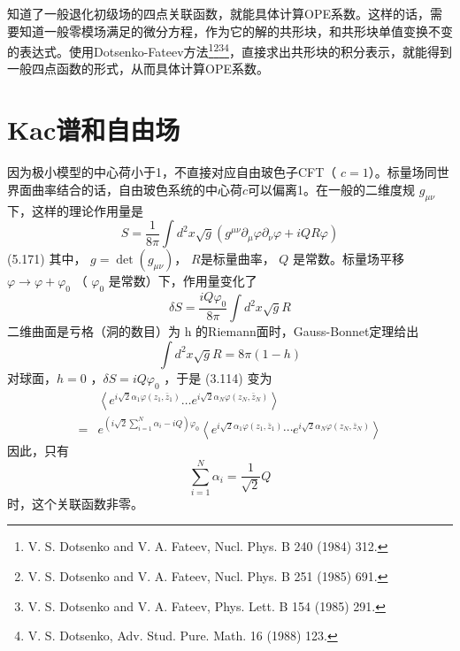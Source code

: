 知道了一般退化初级场的四点关联函数，就能具体计算OPE系数。这样的话，需要知道一般零模场满足的微分方程，作为它的解的共形块，和共形块单值变换不变的表达式。使用Dotsenko-Fateev方法\footnote{V. S. Dotsenko and V. A. Fateev, Nucl. Phys. B 240 (1984) 312.}\footnote{V. S. Dotsenko and V. A. Fateev, Nucl. Phys. B 251 (1985) 691.}\footnote{V. S. Dotsenko and V. A. Fateev, Phys. Lett. B 154 (1985) 291.}\footnote{V. S. Dotsenko, Adv. Stud. Pure. Math. 16 (1988) 123.}，直接求出共形块的积分表示，就能得到一般四点函数的形式，从而具体计算OPE系数。

\section{Kac谱和自由场}
因为极小模型的中心荷小于1，不直接对应自由玻色子CFT（ $c=1 $）。标量场同世界面曲率结合的话，自由玻色系统的中心荷$ c $可以偏离1。在一般的二维度规 $g_{\mu\nu}$ 下，这样的理论作用量是
\begin{equation}
	S=\frac{1}{8 \pi} \int d^{2} x \sqrt{g}\left(g^{\mu \nu} \partial_{\mu} \varphi \partial_{\nu} \varphi+i Q R \varphi\right)
\end{equation} \quad \quad (5.171)
其中， $g=\operatorname{det}\left(g_{\mu \nu}\right) $， $R $是标量曲率， $Q$ 是常数。标量场平移 $\varphi \rightarrow \varphi+\varphi_{0}$ （ $\varphi_0$ 是常数）下，作用量变化了
$$
\delta S=\frac{i Q \varphi_{0}}{8 \pi} \int d^{2} x \sqrt{g} R
$$
二维曲面是亏格（洞的数目）为 h 的Riemann面时，Gauss-Bonnet定理给出
\begin{equation}
	\int d^{2} x \sqrt{g} R=8 \pi(1-h)
\end{equation} 
对球面，$ h=0$ ，$ \delta S=i Q \varphi_{0}$ ，于是 (3.114) 变为
\begin{equation}
	\begin{aligned} &\left\langle e^{i \sqrt{2} \alpha_{1} \varphi\left(z_{1}, \bar{z}_{1}\right)} \ldots e^{i \sqrt{2} \alpha_{N} \varphi\left(z_{N}, \bar{z}_{N}\right)}\right\rangle \\ =& e^{\left(i \sqrt{2} \sum_{i=1}^{N} \alpha_{i}-i Q\right) \varphi_{0}}\left\langle e^{i \sqrt{2} \alpha_{1} \varphi\left(z_{1}, \bar{z}_{1}\right)} \cdots e^{i \sqrt{2} \alpha_{N} \varphi\left(z_{N}, \bar{z}_{N}\right)}\right\rangle \end{aligned} 
\end{equation}
因此，只有
\begin{equation}
	\sum_{i=1}^{N} \alpha_{i}=\frac{1}{\sqrt{2}} Q
\end{equation} 
时，这个关联函数非零。

